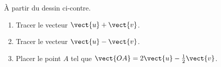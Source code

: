 
\begin{exercice}\label{exosmath-0068}

    À partir du dessin ci-contre.
    \begin{multicols}{2}
        \begin{enumerate}
            \item
                Tracer le vecteur \( \vect{ u }+\vect{ v }\).
            \item
                Tracer le vecteur \( \vect{ u }-\vect{ v }\).
            \item
                Placer le point \( A\) tel que \( \vect{ OA }=2\vect{ u }-\frac{ 1 }{2}\vect{ v }\). 
        \end{enumerate}

        \columnbreak



    \end{multicols}

\end{exercice}
